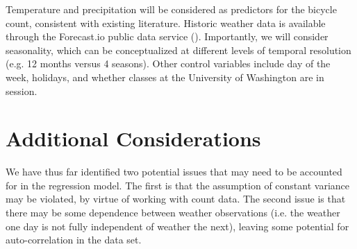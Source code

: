 \documentclass[10pt,letterpaper,article]{memoir} %
\begin{document}
Temperature and precipitation will be considered as predictors for the
bicycle count, consistent with existing literature. Historic weather
data is available through the Forecast.io public data service
(\cite{The-Dark-Sky-Company:aa}). Importantly, we will consider
seasonality, which can be conceptualized at different levels of
temporal resolution (e.g. 12 months versus 4 seasons). Other control
variables include day of the week, holidays, and whether classes at
the University of Washington are in session.

\chapter*{Additional Considerations}
We have thus far identified two potential issues that may need to be
accounted for in the regression model. The first is that the
assumption of constant variance may be violated, by virtue of working
with count data. The second issue is that there may be some dependence
between weather observations (i.e. the weather one day is not fully
independent of weather the next), leaving some potential for
auto-correlation in the data set.

\printbibliography
\end{document}
